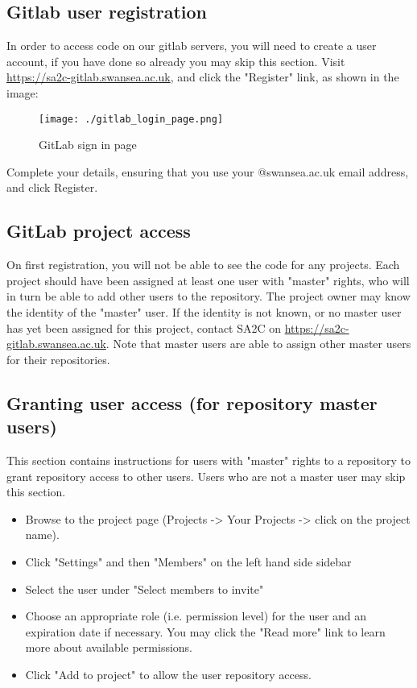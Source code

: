 \documentclass[11pt]{article}
\begin{document}
\subsection{Gitlab user registration}
\label{sec:orgd56f655}
In order to access code on our gitlab servers, you will need to create a
user account, if you have done so already you may skip this section. Visit
\href{https://sa2c-gitlab.swansea.ac.uk}{https://sa2c-gitlab.swansea.ac.uk}, and click the "Register" link, as shown in
the image:

\begin{figure}[htbp]
\centering
\texttt{[image: ./gitlab\_login\_page.png]}
\caption{GitLab sign in page}
\end{figure}


Complete your details, ensuring that you use your @swansea.ac.uk email address,
and click Register.

\subsection{GitLab project access}
\label{sec:orgc78852f}
On first registration, you will not be able to see the code for any projects.
Each project should have been assigned at least one user with "master" rights, who will in
turn be able to add other users to the repository. The project
owner may know the identity of the "master" user. If the identity is not known,
or no master user has yet been assigned for this project, contact SA2C on
\href{https://sa2c-gitlab.swansea.ac.uk}{https://sa2c-gitlab.swansea.ac.uk}. Note that master users are able to assign
other master users for their repositories.

\subsection{Granting user access (for repository master users)}
\label{sec:orgc785794}
This section contains instructions for users with "master" rights to a repository to
grant repository access to other users. Users who are not a master user may skip
this section.

\begin{itemize}
\item Browse to the project page (Projects -> Your Projects -> click on the project
name).
\item Click "Settings" and then "Members" on the left hand side sidebar
\item Select the user under "Select members to invite"
\item Choose an appropriate role (i.e. permission level) for the user and an
expiration date if necessary. You may click the "Read more" link to learn more
about available permissions.
\item Click "Add to project" to allow the user repository access.
\end{itemize}
\end{document}
